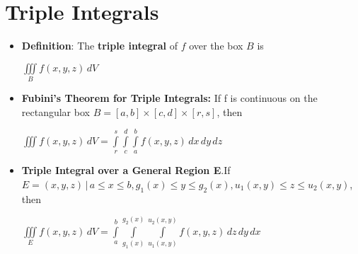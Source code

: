 \documentclass{report}
\begin{document}
	\section{Triple Integrals}
		\begin{itemize}\addtolength{\leftskip}{2em}
			\item \textbf{Definition}: The \textbf{triple integral} of $f$ over the box $B$ is 
			\begin{center}
				\Large$\iiint\limits_{B}f(x,y,z)\,dV$
			\end{center}
			\large\item \textbf{Fubini's Theorem for Triple Integrals:} If f is continuous on the rectangular box \newline$B=[a,b]\times [c,d]\times [r,s]$, then 
			\begin{center}
				\Large$\iiint f(x,y,z)\, dV=\int\limits_{r}^{s}\int\limits_{c}^{d}\int\limits_{a}^{b}f(x,y,z)\, dx\, dy\, dz$
			\end{center}
			\large\item \textbf{Triple Integral over a General Region E}.\newline If $E={(x,y,z)\,|\, a\le x \le b, g_1(x) \le y \le g_2(x), u_1(x,y) \le z \le u_2(x,y)}$, then
			\begin{center}
				\Large$\iiint\limits_{E}f(x,y,z)\,dV=\int\limits_{a}^{b}\int\limits_{g_1(x)}^{g_2(x)}\int\limits_{u_1(x,y)}^{u_2(x,y)}f(x,y,z)\,dz\,dy\,dx$
			\end{center}
		\end{itemize}
\end{document}
